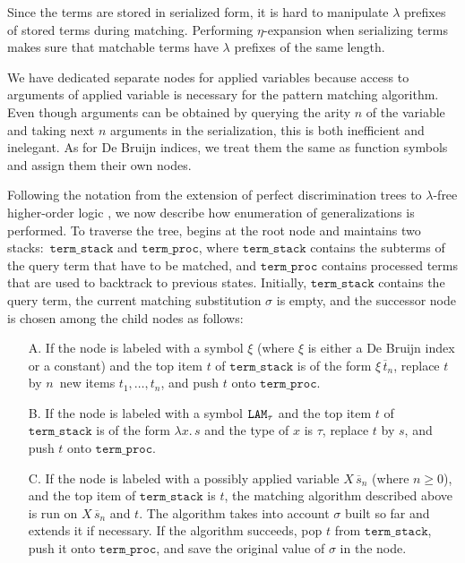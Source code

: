 Since the terms are stored in serialized form, it is hard to manipulate
$\lambda$ prefixes of stored terms during matching. Performing $\eta$-expansion
when serializing terms makes sure that matchable terms have
$\lambda$ prefixes of the same length.

We have dedicated separate nodes for applied variables because access to arguments
of applied variable is necessary for the pattern matching algorithm. Even though
arguments can be obtained by querying the arity $n$ of the variable and taking
next $n$ arguments in the serialization, this is both inefficient and inelegant.
As for De Bruijn indices, we treat them the same as function symbols and assign
them their own nodes.

\newcommand{\tstack}{\ensuremath{\texttt{term\_stack}}}
\newcommand{\tproc}{\ensuremath{\texttt{term\_proc}}}

Following the notation from the extension of perfect discrimination trees to
$\lambda$-free higher-order logic \cite{section-ehoh}, we now describe how enumeration of
generalizations is performed. To traverse the tree, \ehohii{} begins at the root
node and maintains two stacks:\ \tstack{} and \tproc{}, where \tstack{} contains the
subterms of the query term that have to be matched, and \tproc{} contains
processed terms that are used to backtrack to previous states. Initially,
\tstack{} contains the query term, the current matching substitution
$\sigma$ is empty, and the successor node is chosen among the child nodes as
follows:

\begin{enumerate}
\item[A.] If the node is labeled with a symbol $\xi$ (where
  $\xi$ is either a De Bruijn index or a constant) and the top item $t$
  of \tstack{} is of the form $\xi \, \overline{t}_n$, replace $t$ by
  $n$~new items $t_1,\dots,t_n$, and push $t$ onto \tproc{}.
\smallskip
\item[B.] If the node is labeled with a symbol $\texttt{LAM}_\tau$ and the top
  item $t$ of \tstack{} is of the form $\lambda x.\, s$ and the type of $x$ is
  $\tau$, replace $t$ by $s$, and push $t$ onto \tproc{}.
\smallskip
\item[C.] If the node is labeled with a possibly applied variable $X \, \overline{s}_n$
  (where $n \geq 0$), and the top item of \tstack{} is $t$, the 
  matching algorithm described above is run on $X \, \overline{s}_n$ and $t$.
  The algorithm takes into account $\sigma$ built so far and extends it
  if necessary. If the algorithm succeeds, pop $t$ from \tstack{}, push it onto \tproc{},
  and save the original value of $\sigma$ in the node.
\end{enumerate}
  
